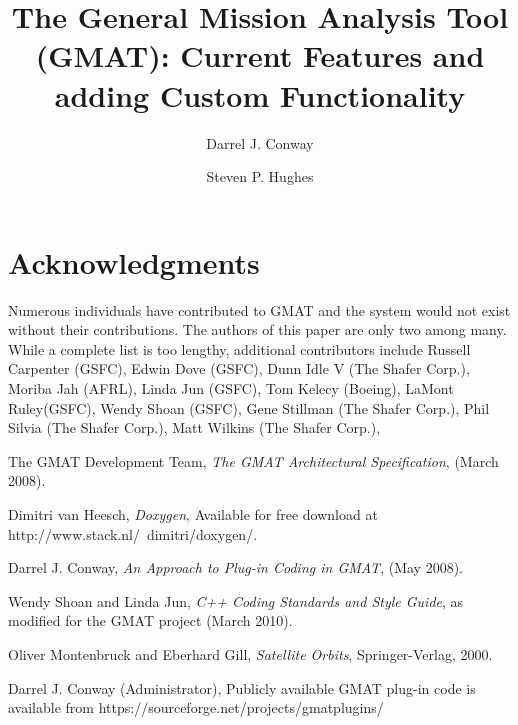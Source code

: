 \documentclass[a4paper,twocolumn]{esapub2005} %
\title{The General Mission Analysis Tool (GMAT): Current Features and adding Custom Functionality}
\author{Darrel J. Conway}
\affil{Thinking Systems, Inc., Tucson, AZ, USA}
\author{Steven P. Hughes}
\affil{NASA Goddard Space Flight Center, Greenbelt, MD, USA}
\begin{document}

\maketitle








\section*{Acknowledgments}

Numerous individuals have contributed to GMAT and the system would not exist without their contributions.  The authors of this paper are only two among many.  While a complete list is too lengthy, additional contributors include Russell Carpenter (GSFC), Edwin Dove (GSFC), Dunn Idle \textrm{V} (The Shafer Corp.), Moriba Jah (AFRL), Linda Jun (GSFC), Tom Kelecy (Boeing), LaMont Ruley(GSFC), Wendy Shoan (GSFC), Gene Stillman (The Shafer Corp.), Phil Silvia (The Shafer Corp.), Matt Wilkins (The Shafer Corp.),

%   
%   

\begin{thebibliography}{}
 The GMAT Development Team, \textit{The GMAT Architectural Specification}, (March
2008).

 Dimitri van Heesch, \textit{Doxygen}, Available for free download at
http://www.stack.nl/~dimitri/doxygen/.

 Darrel J. Conway, \textit{An Approach to Plug-in Coding in GMAT}, (May 2008).

 Wendy Shoan and Linda Jun, \textit{C++ Coding Standards and Style Guide},
as modified for the GMAT project (March 2010).

Oliver Montenbruck and Eberhard Gill, \textit{Satellite Orbits}, Springer-Verlag, 2000.

Darrel J. Conway (Administrator), Publicly available GMAT
plug-in code is available from https://sourceforge.net/projects/gmatplugins/

\end{thebibliography}
\end{document}
